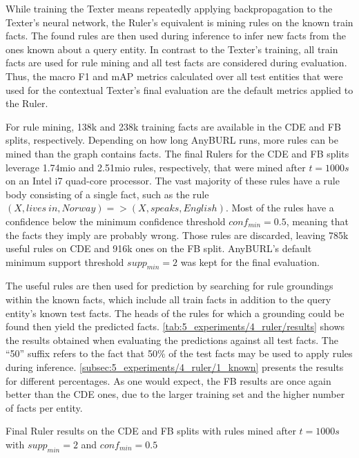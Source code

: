 While training the Texter means repeatedly applying backpropagation to the Texter's neural network, the Ruler's equivalent is mining rules on the known train facts. The found rules are then used during inference to infer new facts from the ones known about a query entity. In contrast to the Texter's training, all train facts are used for rule mining and all test facts are considered during evaluation. Thus, the macro F1 and mAP metrics calculated over all test entities that were used for the contextual Texter's final evaluation are the default metrics applied to the Ruler.

For rule mining, 138k and 238k training facts are available in the CDE and FB splits, respectively. Depending on how long AnyBURL runs, more rules can be mined than the graph contains facts. The final Rulers for the CDE and FB splits leverage 1.74mio and 2.51mio rules, respectively, that were mined after $t = 1000s$ on an Intel i7 quad-core processor. The vast majority of these rules have a rule body consisting of a single fact, such as the rule $(X, lives~in, Norway) => (X, speaks, English)$. Most of the rules have a confidence below the minimum confidence threshold $conf_{min} = 0.5$, meaning that the facts they imply are probably wrong. Those rules are discarded, leaving 785k useful rules on CDE and 916k ones on the FB split. AnyBURL's default minimum support threshold $supp_{min} = 2$ was kept for the final evaluation.

The useful rules are then used for prediction by searching for rule groundings within the known facts, which include all train facts in addition to the query entity's known test facts. The heads of the rules for which a grounding could be found then yield the predicted facts. \autoref{tab:5_experiments/4_ruler/results} shows the results obtained when evaluating the predictions against all test facts. The ``50'' suffix refers to the fact that 50\% of the test facts may be used to apply rules during inference. \autoref{subsec:5_experiments/4_ruler/1_known} presents the results for different percentages. As one would expect, the FB results are once again better than the CDE ones, due to the larger training set and the higher number of facts per entity.

\begin{table}[h]
    \centering
    
    \caption{Final Ruler results on the CDE and FB splits with rules mined after $t = 1000s$ with $supp_{min} = 2$ and $conf_{min} = 0.5$}
    \label{tab:5_experiments/4_ruler/results}
\end{table}

